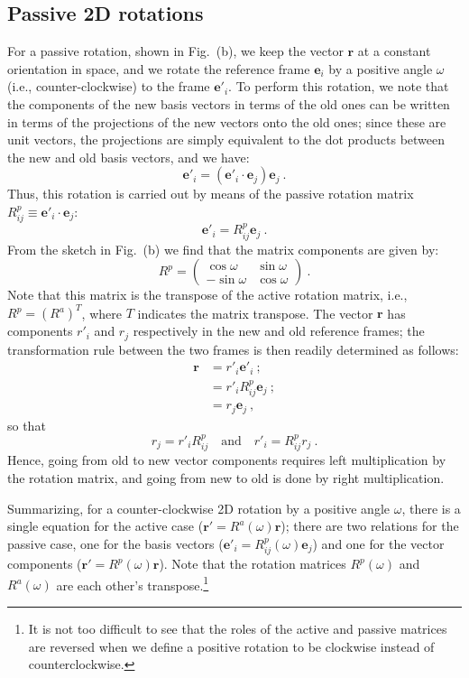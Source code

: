 \subsection{Passive 2D rotations}
For a passive rotation, shown in Fig.~(b), we keep the vector $\mathbf{r}$ at a constant orientation in space, and we rotate the reference frame $\mathbf{e}_i$ by a positive angle $\omega$ (i.e., counter-clockwise) to the frame $\mathbf{e}'_i$.  To perform this rotation, we note that the components of the new basis vectors in terms of the old ones can be written in terms of the projections of the new vectors onto the old ones; since these are unit vectors, the projections are simply equivalent to the dot products between the new and old basis vectors, and we have:
\[
	\mathbf{e}'_i = (\mathbf{e}'_i\cdot\mathbf{e}_j)\mathbf{e}_j \ .
\]
Thus, this rotation is carried out by means of the passive rotation matrix $R^p_{ij}\equiv \mathbf{e}'_i\cdot\mathbf{e}_j$:
\[
	\mathbf{e}'_i = R^p_{ij}\mathbf{e}_j \ .
\]
From the sketch in Fig.~(b) we find that the matrix components are given by:
\[
	R^p = \left(\begin{array}{cc}
	\cos\omega & \sin\omega\\
	-\sin\omega & \cos\omega\end{array}\right) \ .
\]
Note that this matrix is the transpose of the active rotation matrix, i.e., $R^p = (R^a)^T$, where $T$ indicates the matrix transpose.  The vector $\mathbf{r}$ has components $r'_i$ and $r_j$ respectively in the new and old reference frames; the transformation rule between the two frames is then readily determined as follows:
\begin{align*}
	\mathbf{r} &= r'_i\mathbf{e}'_i\ ; \\
	&= r'_i R^p_{ij}\mathbf{e}_j\ ; \\
	&= r_j\mathbf{e}_j\ ,
\end{align*}
so that 
\[
	r_j = r'_i R^p_{ij}\quad\text{and}\quad r'_i = R^p_{ij} r_j\ .
\]
Hence, going from old to new vector components requires left multiplication by the rotation matrix, and going from new to old is done by right multiplication.

Summarizing, for a counter-clockwise 2D rotation by a positive angle $\omega$, there is a single equation for the active case ($\mathbf{r}'=R^a(\omega)\mathbf{r}$); there are two relations for the passive case, one for the basis vectors ($\mathbf{e}'_i=R^p_{ij}(\omega)\mathbf{e}_j$) and one for the vector components ($\mathbf{r}' = R^p(\omega)\mathbf{r}$).  Note that the rotation matrices $R^p(\omega)$ and $R^a(\omega)$ are each other's transpose.\footnote{It is not too difficult to see that the roles of the active and passive matrices are reversed when we define a positive rotation to be clockwise instead of counterclockwise.}







